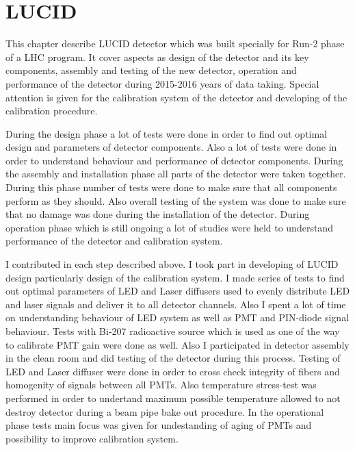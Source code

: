 \chapter{LUCID}
\label{chap:LUCID}


This chapter describe LUCID detector which was built specially for Run-2 phase of a LHC program.
It cover aspects as design of the detector and its key components, assembly and testing of the new detector, 
operation and performance of the detector during 2015-2016 years of data taking.
Special attention is given for the calibration system of the detector and developing of the calibration procedure.

During the design phase a lot of tests were done in order to find out optimal design and parameters of detector components.
Also a lot of tests were done in order to understand behaviour and performance of detector components.
During the assembly and installation phase all parts of the detector were taken together. During this phase number of tests were done
to make sure that all components perform as they should.
Also overall testing of the system was done to make sure that no damage was done during the installation of the detector.
During operation phase which is still ongoing a lot of studies were held to understand performance of the detector and calibration system.

I contributed in each step described above. I took part in developing of LUCID design particularly design of the calibration system. 
I made series of tests to find out optimal parameters of LED and Laser diffusers used to evenly distribute LED and laser signals and deliver it to all detector channels.
Also I spent a lot of time on understanding behaviour of LED system as well as PMT and PIN-diode signal behaviour.
Tests with Bi-207 radioactive source which is used as one of the way to calibrate PMT gain were done as well.
Also I participated in detector assembly in the clean room and did testing of the detector during this process.
Testing of LED and Laser diffuser were done in order to cross check integrity of fibers and homogenity of signals between all PMTs.
Also temperature stress-test was performed in order to undertand maximum possible temperature allowed to not destroy detector during a beam pipe bake out procedure.
In the operational phase tests main focus was given for undestanding of aging of PMTs and possibility to improve calibration system.

